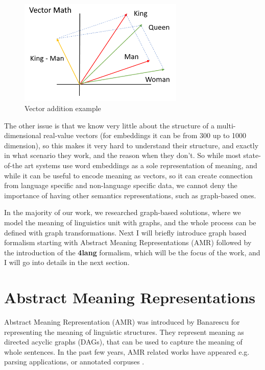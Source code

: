 \begin{figure}[h!]
	\centering
	\includegraphics[width=0.7\textwidth]{figures/vecs}
	\caption{Vector addition example}
	\label{fig:vecs}
\end{figure}

The other issue is that we know very little about the structure of a multi-dimensional real-value vectors (for embeddings it can be from 300 up to 1000 dimension), so this makes it very hard to understand their structure, and exactly in what scenario they work, and the reason when they don't. So while most state-of-the art systems use word embeddings as a sole representation of meaning, and while it can be useful to encode meaning as vectors, so it can create connection from language specific and non-language specific data, we cannot deny the importance of having other semantics representations, such as graph-based ones. 

In the majority of our work, we researched graph-based solutions, where we model the meaning of linguistics unit with graphs, and the whole process can be defined with graph transformations. Next I will briefly introduce graph based formalism starting with Abstract Meaning Representations (AMR) followed by the introduction of the \textbf{4lang} formalism, which will be the focus of the work, and I will go into details in the next section.

\section{Abstract Meaning Representations}
Abstract Meaning Representation (AMR) was introduced by Banarescu\cite{Banarescu:2013} for representing the meaning of linguistic structures. They represent meaning as directed acyclic graphs (DAGs), that can be used to capture the meaning of whole sentences. In the past few years, AMR related works have appeared e.g. parsing applications, or annotated corpuses \cite{Banarescu:2013, OGorman2018AMRBT, DAC:2017}.

